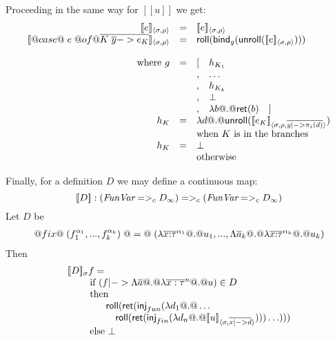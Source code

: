 \documentclass[preprint,nocopyrightspace]{sigplanconf}
\begin{document}
Proceeding in the same way for $[\![u]\!]$ we get:
\[\begin{array}{rcll}
  \interp{e}{\sigma}{\rho} & = & \multicolumn{2}{l}{\interp{e}{\sigma}{\rho}} \\ 
  \interp{@case@\;e\;@of@ \ol{ K\;\ys -> e_K}}{\sigma}{\rho} & = & \multicolumn{2}{l}{\roll(\bind_{g} (\unroll(\interp{e}{\sigma}{\rho})))} \\ \\ 
  \text{ where } g  & = & [ & h_{K_1} \\
                    &   & , & \ldots \\
                    &   & , & h_{K_k} \\
                    &   & , & \bot \\ 
                    &   & , & \dlambda b @.@ \ret(b) \quad ] \\ 
              h_{K} & =  & \multicolumn{2}{l}{\dlambda d @.@ \unroll(\interp{e_K}{\sigma}{\rho, \ol{y |-> \pi_i(d)}})} \\ 
                    &   & \multicolumn{2}{l}{\text{when } K \text{ is in the branches}} \\
              h_{K}  & = & \multicolumn{2}{l}{\bot } \\ 
                    &   & \multicolumn{2}{l}{\text{otherwise}}                  
\end{array}\]

Finally, for a definition $D$ we may define a continuous map:
\[ 
        [\![D]\!] : (\textit{FunVar} =>_c D_{\infty}) =>_c (\textit{FunVar} =>_c D_{\infty}) 
\]
Let $D$ be 
\[\begin{array}{l} 
     @fix@\;(f_1^{\alpha_1},...,f_k^{\alpha_k})\;@=@\; 
     (\lambda{\overline{x{:}\tau}^{\alpha_1}} @.@ u_1,...,
                   \Lambda\overline{a}_k @.@ \lambda{\overline{x{:}\tau}^{\alpha_k}} @.@ u_k) 
\end{array}\] 
Then
\[\begin{array}{l}  
   [\![D]\!]_{\sigma} f =  \\ 
     \qquad\mbox{ if } (f |-> \Lambda\overline{a} @.@ \lambda\overline{x:\tau}^{n} @.@ u) \in D \\
     \qquad\mbox{ then } \\
     \qquad\quad\quad \mathsf{roll}(\mathsf{ret}(\mathsf{inj}_{fun}(\mathsf{\lambda} d_1 @.@ \ldots  \\
     \qquad\quad\quad\quad \mathsf{roll}(\mathsf{ret}(\mathsf{inj}_{fin}(\mathsf{\lambda} d_n @.@ [\![u]\!]_{\langle {\sigma},{\overline{x |-> d}}\rangle})))\ldots))) \\
     \qquad \mbox{ else } \bot
\end{array}\]
\end{document}
